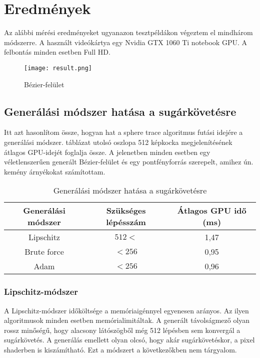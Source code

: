 \chapter{Eredmények}

Az alábbi mérési eredményeket ugyanazon tesztpéldákon végeztem el mindhárom módszerre. A használt videókártya egy Nvidia GTX 1060 Ti notebook GPU. A felbontás minden esetben Full HD.

\begin{figure}[H]
	\centering
	\texttt{[image: result.png]}
	\caption{Bézier-felület}
	\label{img:bezSurf}
\end{figure}

\section{Generálási módszer hatása a sugárkövetésre}

Itt azt hasonlítom össze, hogyan hat a sphere trace algoritmus futási idejére a generálási módszer.  táblázat utolsó oszlopa 512 képkocka megjelenítésének átlagos GPU-idejét foglalja össze. A jelenetben minden esetben egy véletlenszerűen generált Bézier-felület és egy pontfényforrás szerepelt, amihez ún. kemény árnyékokat számítottam.

\begin{table}[H]
	\begin{center}
		\begin{tabular}{| c || c | c |}
			\hline
			\textbf{Generálási módszer} & \textbf{Szükséges lépésszám} & \textbf{Átlagos GPU idő (ms)} \\ 
			\hline\hline
			Lipschitz & $512<$ & 1,47 \\
			\hline
			Brute force & $<256$ & 0,95 \\
			\hline
			Adam & $<256$ & 0,96 \\
			\hline
		\end{tabular}
	\end{center}
	\caption{Generálási módszer hatása a sugárkövetésre}
	\label{tab:trace}
\end{table}

\subsection{Lipschitz-módszer}
A Lipschitz-módszer időköltsége a memóriaigénnyel egyenesen arányos. Az ilyen algoritmusok minden esetben memórialimitáltak. A generált távolságmező olyan rossz minőségű, hogy alacsony látószögből még 512 lépésben sem konvergál a sugárkövetés. A generálás emellett olyan olcsó, hogy akár sugárkövetéskor, a pixel shaderben is kiszámítható. Ezt a módszert a következőkben nem tárgyalom.

